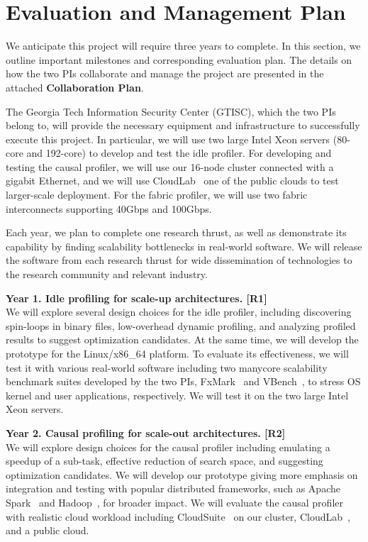 \section{Evaluation and Management Plan}
\label{sec:manage}
We anticipate this project will require three years to complete. In
this section, we outline important milestones and corresponding
evaluation plan. The details on how the two PIs collaborate and manage
the project are presented in the attached \textbf{Collaboration
Plan}.

The Georgia Tech Information Security Center (GTISC), which the two PIs
belong to, will provide the necessary equipment and infrastructure to
successfully execute this project.
In particular, we will use two large Intel Xeon servers (80-core and
192-core) to develop and test the idle profiler. For
developing and testing the causal profiler, we will use our 16-node
cluster connected with a gigabit Ethernet, and we will use
CloudLab~\cite{cloudlab:web} one of the public clouds to test
larger-scale deployment. For the fabric profiler, we will use two
fabric interconnects supporting 40Gbps and 100Gbps.

Each year, we plan to complete one research thrust, as well as
demonstrate its capability by finding scalability bottlenecks in
real-world software. We will release the software from each research
thrust for wide dissemination of technologies to the research community
and relevant industry.

\squishlist
\item \textbf{Year 1. Idle profiling for scale-up architectures.
  {[R1]}} \\
  We will explore several design choices for the idle profiler, including
  discovering spin-loops in binary files, low-overhead dynamic
  profiling, and analyzing profiled results to suggest optimization
  candidates. At the same time, we will develop the prototype for the Linux/x86_64
  platform.
  To evaluate its effectiveness, we will test it
  with various real-world software including two manycore scalability
  benchmark suites developed by the two PIs, FxMark~\cite{min:fxmark} and
  VBench~\cite{kashyap:oppspinlocks}, to stress OS kernel and user
  applications, respectively. We will test it on the two large Intel Xeon
  servers.

\item \textbf{Year 2. Causal profiling for scale-out architectures.
  {[R2]}} \\
  We will explore design choices for the causal profiler including
  emulating a speedup of a sub-task, effective reduction of search
  space, and suggesting optimization candidates. We
  will develop our prototype giving more
  emphasis on integration and testing with popular distributed
  frameworks, such as Apache Spark~\cite{spark} and
  Hadoop~\cite{hadoop:web}, for broader impact.
  We will evaluate the causal profiler with realistic cloud workload
  including CloudSuite~\cite{cloudsuite:asplos12} on our cluster,
  CloudLab~\cite{cloudlab:web}, and a public cloud.


